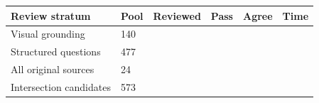 \begin{tabular}{llrrrr}
\toprule
Review stratum & Pool & Reviewed & Pass & Agree & Time\\\midrule
Visual grounding & 140 &  &  &  & \\
Structured questions & 477 &  &  &  & \\
All original sources & 24 &  &  &  & \\
Intersection candidates & 573 &  &  &  & \\
\bottomrule
\end{tabular}

